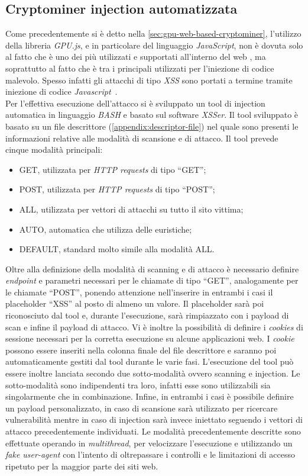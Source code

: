 \documentclass[conference, italian]{IEEEtran}
\begin{document}
\subsection{Cryptominer injection automatizzata}\label{sec:cryptominer-automatic-injection}
Come precedentemente si è detto nella \cref{sec:gpu-web-based-cryptominer}, l'utilizzo della libreria \emph{GPU.js}, e in particolare del linguaggio \emph{JavaScript}, non è dovuta solo al fatto che è uno dei più utilizzati e supportati all'interno del web \citep{w3techsJavascriptPopularity}, ma soprattutto al fatto che è tra i principali utilizzati per l'iniezione di codice malevolo. Spesso infatti gli attacchi di tipo \emph{XSS} sono portati a termine tramite iniezione di codice \emph{Javascript}~\cite{owaspxss}.\\
Per l'effettiva esecuzione dell'attacco si è sviluppato un tool di injection automatica in linguaggio \emph{BASH} e basato sul software \emph{XSSer}. Il tool sviluppato è basato su un file descrittore (\cref{appendix:descriptor-file}) nel quale sono presenti le informazioni relative alle modalità di scansione e di attacco. Il tool prevede cinque modalità principali:
\begin{itemize}
  \item GET, utilizzata per \emph{HTTP requests} di tipo ``GET'';\@
  \item POST, utilizzata per \emph{HTTP requests} di tipo ``POST'';\@
  \item ALL, utilizzata per vettori di attacchi su tutto il sito vittima;
  \item AUTO, automatica che utilizza delle euristiche;
  \item DEFAULT, standard molto simile alla modalità ALL.\@
\end{itemize}
Oltre alla definizione della modalità di scanning e di attacco è necessario definire \emph{endpoint} e parametri necessari per le chiamate di tipo ``GET'', analogamente per le chiamate ``POST'', ponendo attenzione nell'inserire in entrambi i casi il placeholder ``XSS'' al posto di almeno un valore. Il placeholder sarà poi riconosciuto dal tool e, durante l'esecuzione, sarà rimpiazzato con i payload di scan e infine il payload di attacco. Vi è inoltre la possibilità di definire i \emph{cookies} di sessione necessari per la corretta esecuzione su alcune applicazioni web. I \emph{cookie} possono essere inseriti nella colonna finale del file descrittore e saranno poi automaticamente gestiti dal tool durante le varie fasi.
L'esecuzione del tool può essere inoltre lanciata secondo due sotto-modalità ovvero scanning e injection. Le sotto-modalità sono indipendenti tra loro, infatti esse sono utilizzabili sia singolarmente che in combinazione. Infine, in entrambi i casi è possibile definire un payload personalizzato, in caso di scansione sarà utilizzato per ricercare vulnerabilità mentre in caso di injection sarà invece iniettato seguendo i vettori di attacco precedentemente individuati. Le modalità precedentemente descritte sono effettuate operando in \emph{multithread}, per velocizzare l'esecuzione e utilizzando un \emph{fake user-agent} con l'intento di oltrepassare i controlli e le limitazioni di accesso ripetuto per la maggior parte dei siti web.\\
\end{document}
